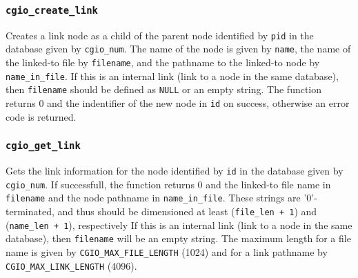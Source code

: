 \subsubsection{\texttt{cgio\_create\_link}} \label{create_link}
    \noindent
    Creates a link node as a child of the parent node identified by \texttt{pid}
    in the database given by \texttt{cgio\_num}. The name of the node is given
    by \texttt{name}, the name of the linked-to file by \texttt{filename}, and
    the pathname to the linked-to node by \texttt{name\_in\_file}. If this is an
    internal link (link to a node in the same database), then \texttt{filename}
    should be defined as \texttt{NULL} or an empty string. The function
    returns 0 and the indentifier of the new node in \texttt{id} on success,
    otherwise an error code is returned.

\subsubsection{\texttt{cgio\_get\_link}} \label{get_link}
    \noindent
    Gets the link information for the node identified by \texttt{id} in the
    database given by \texttt{cgio\_num}. If successfull, the function returns
    0 and the linked-to file name in \texttt{filename} and the node pathname
    in \texttt{name\_in\_file}. These strings are '0'-terminated, and thus
    should be dimensioned at least (\texttt{file\_len + 1}) and
    (\texttt{name\_len + 1}), respectively If this is an internal link
    (link to a node in the same database), then \texttt{filename} will be an
    empty string. The maximum length for a file name is given by
    \texttt{CGIO\_MAX\_FILE\_LENGTH} (1024) and for a link pathname by
    \texttt{CGIO\_MAX\_LINK\_LENGTH} (4096).

